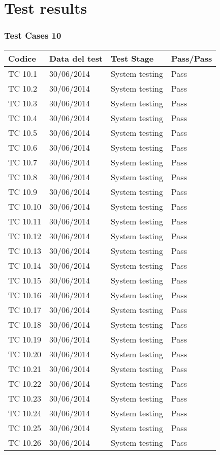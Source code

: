 \chapter{Test results}

\subsection{Test Cases 10}

\begin{longtable}{|p{3cm}|p{3cm}|p{3cm}|p{3cm}|}
	\hline
	\rowcolor{Gray}
	\textbf{Codice} & \textbf{Data del test} & \textbf{Test Stage} & \textbf{Pass/Pass}\tabularnewline
	\hline
	TC 10.1			& 30/06/2014 			& System testing		& Pass \tabularnewline
	\hline
	TC 10.2			& 30/06/2014 			& System testing		& Pass \tabularnewline
	\hline
	TC 10.3			& 30/06/2014 			& System testing		& Pass \tabularnewline
	\hline
	TC 10.4			& 30/06/2014 			& System testing		& Pass \tabularnewline
	\hline
	TC 10.5			& 30/06/2014 			& System testing		& Pass \tabularnewline
	\hline
	TC 10.6			& 30/06/2014 			& System testing		& Pass \tabularnewline
	\hline
	TC 10.7			& 30/06/2014 			& System testing		& Pass \tabularnewline
	\hline
	TC 10.8			& 30/06/2014 			& System testing		& Pass \tabularnewline
	\hline
	TC 10.9			& 30/06/2014 			& System testing		& Pass \tabularnewline
	\hline
	TC 10.10			& 30/06/2014 			& System testing		& Pass \tabularnewline
	\hline
	TC 10.11			& 30/06/2014 			& System testing		& Pass \tabularnewline
	\hline
	TC 10.12			& 30/06/2014 			& System testing		& Pass \tabularnewline
	\hline
	TC 10.13			& 30/06/2014 			& System testing		& Pass \tabularnewline
	\hline
	TC 10.14			& 30/06/2014 			& System testing		& Pass \tabularnewline
	\hline
	TC 10.15			& 30/06/2014 			& System testing		& Pass \tabularnewline
	\hline
	TC 10.16			& 30/06/2014 			& System testing		& Pass \tabularnewline
	\hline
	TC 10.17			& 30/06/2014 			& System testing		& Pass \tabularnewline
	\hline
	TC 10.18			& 30/06/2014 			& System testing		& Pass \tabularnewline
	\hline
	TC 10.19			& 30/06/2014 			& System testing		& Pass \tabularnewline
	\hline
	TC 10.20			& 30/06/2014 			& System testing		& Pass \tabularnewline
	\hline
	TC 10.21			& 30/06/2014 			& System testing		& Pass \tabularnewline
	\hline
	TC 10.22			& 30/06/2014 			& System testing		& Pass \tabularnewline
	\hline
	TC 10.23			& 30/06/2014 			& System testing		& Pass \tabularnewline
	\hline
	TC 10.24			& 30/06/2014 			& System testing		& Pass \tabularnewline
	\hline
	TC 10.25			& 30/06/2014 			& System testing		& Pass \tabularnewline
	\hline
	TC 10.26			& 30/06/2014 			& System testing		& Pass \tabularnewline

\end{longtable}
